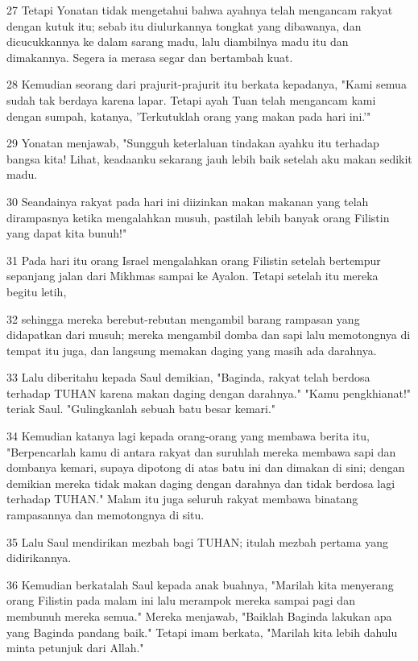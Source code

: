 \par 27 Tetapi Yonatan tidak mengetahui bahwa ayahnya telah mengancam rakyat dengan kutuk itu; sebab itu diulurkannya tongkat yang dibawanya, dan dicucukkannya ke dalam sarang madu, lalu diambilnya madu itu dan dimakannya. Segera ia merasa segar dan bertambah kuat.
\par 28 Kemudian seorang dari prajurit-prajurit itu berkata kepadanya, "Kami semua sudah tak berdaya karena lapar. Tetapi ayah Tuan telah mengancam kami dengan sumpah, katanya, 'Terkutuklah orang yang makan pada hari ini.'"
\par 29 Yonatan menjawab, "Sungguh keterlaluan tindakan ayahku itu terhadap bangsa kita! Lihat, keadaanku sekarang jauh lebih baik setelah aku makan sedikit madu.
\par 30 Seandainya rakyat pada hari ini diizinkan makan makanan yang telah dirampasnya ketika mengalahkan musuh, pastilah lebih banyak orang Filistin yang dapat kita bunuh!"
\par 31 Pada hari itu orang Israel mengalahkan orang Filistin setelah bertempur sepanjang jalan dari Mikhmas sampai ke Ayalon. Tetapi setelah itu mereka begitu letih,
\par 32 sehingga mereka berebut-rebutan mengambil barang rampasan yang didapatkan dari musuh; mereka mengambil domba dan sapi lalu memotongnya di tempat itu juga, dan langsung memakan daging yang masih ada darahnya.
\par 33 Lalu diberitahu kepada Saul demikian, "Baginda, rakyat telah berdosa terhadap TUHAN karena makan daging dengan darahnya." "Kamu pengkhianat!" teriak Saul. "Gulingkanlah sebuah batu besar kemari."
\par 34 Kemudian katanya lagi kepada orang-orang yang membawa berita itu, "Berpencarlah kamu di antara rakyat dan suruhlah mereka membawa sapi dan dombanya kemari, supaya dipotong di atas batu ini dan dimakan di sini; dengan demikian mereka tidak makan daging dengan darahnya dan tidak berdosa lagi terhadap TUHAN." Malam itu juga seluruh rakyat membawa binatang rampasannya dan memotongnya di situ.
\par 35 Lalu Saul mendirikan mezbah bagi TUHAN; itulah mezbah pertama yang didirikannya.
\par 36 Kemudian berkatalah Saul kepada anak buahnya, "Marilah kita menyerang orang Filistin pada malam ini lalu merampok mereka sampai pagi dan membunuh mereka semua." Mereka menjawab, "Baiklah Baginda lakukan apa yang Baginda pandang baik." Tetapi imam berkata, "Marilah kita lebih dahulu minta petunjuk dari Allah."
